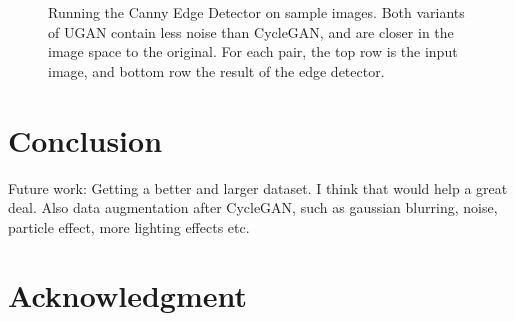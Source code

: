 \documentclass[conference,reqno]{IEEEtran}
\begin{document}
\begin{figure}
\begin{tabular}{p{1.7cm} p{1.7cm} p{1.7cm} p{1.5cm}}
\end{tabular}
\caption{Running the Canny Edge Detector on sample images. Both variants of UGAN contain less noise than CycleGAN,
and are closer in the image space to the original. For each pair, the top row is the input image, and bottom row
the result of the edge detector.}
\end{figure}


\section{Conclusion}

Future work: Getting a better and larger dataset. I think that would help a great deal. Also data augmentation
after CycleGAN, such as gaussian blurring, noise, particle effect, more lighting effects etc.

\section*{Acknowledgment}



\end{document}
